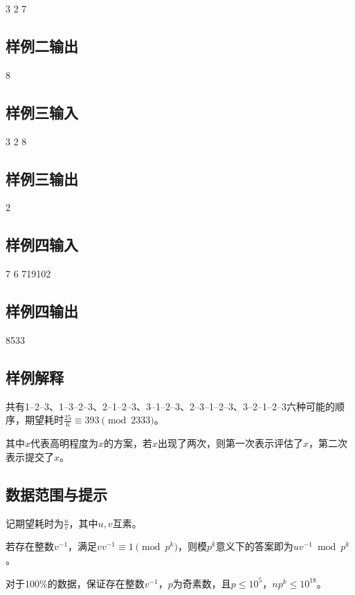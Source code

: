\documentclass{article}
\begin{document}
3 2 7

\subsection*{样例二输出}

8

\subsection*{样例三输入}

3 2 8

\subsection*{样例三输出}

2

\subsection*{样例四输入}

7 6 719102

\subsection*{样例四输出}

8533

\subsection*{样例解释}

共有1--2--3、1--3--2--3、2--1--2--3、3--1--2--3、2--3--1--2--3、3--2--1--2--3六种可能的顺序，期望耗时$\frac{25}{6} \equiv 393 \pmod{2333}$。

其中$x$代表高明程度为$x$的方案，若$x$出现了两次，则第一次表示评估了$x$，第二次表示提交了$x$。

\subsection*{数据范围与提示}

记期望耗时为$\frac{u}{v}$，其中$u,v$互素。

若存在整数$v^{-1}$，满足$vv^{-1} \equiv 1 \pmod{p^k}$，则模$p^k$意义下的答案即为$uv^{-1} \bmod p^k$。

对于100\%的数据，保证存在整数$v^{-1}$，$p$为奇素数，且$p \leq 10^5$，$np^k \leq 10^{18}$。
\end{document}
